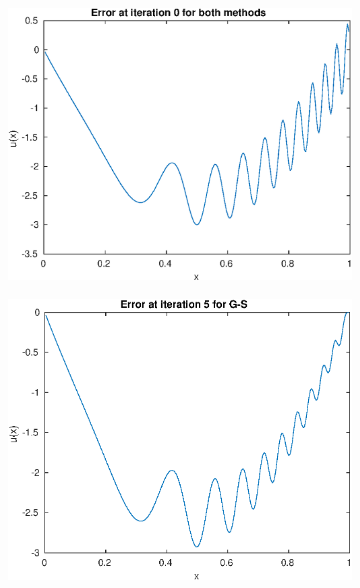 \documentclass{article}
\begin{document}
\begin{figure}[H]
\begin{subfigure}{0.495\linewidth}
    \end{subfigure}
    \begin{subfigure}{0.495\linewidth}
        \centering
        \includegraphics[width=\linewidth]{initialerr.eps}
    \end{subfigure}
    \begin{subfigure}{0.495\linewidth}
        \centering
        \includegraphics[width=\linewidth]{GSerr_i=5.eps}
    \end{subfigure}
\end{figure}
\end{document}
